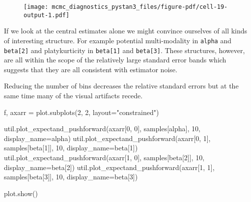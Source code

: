 \documentclass[
  letterpaper,
  DIV=11,
  numbers=noendperiod]{scrartcl}
\newenvironment{Shaded}{\begin{snugshade}}{\end{snugshade}}
\newcommand{\DecValTok}[1]{\textcolor[rgb]{0.68,0.00,0.00}{#1}}
\newcommand{\NormalTok}[1]{\textcolor[rgb]{0.00,0.23,0.31}{#1}}
\newcommand{\OperatorTok}[1]{\textcolor[rgb]{0.37,0.37,0.37}{#1}}
\newcommand{\StringTok}[1]{\textcolor[rgb]{0.13,0.47,0.30}{#1}}
\begin{document}
\begin{figure}[H]

{\centering \texttt{[image: mcmc\_diagnostics\_pystan3\_files/figure-pdf/cell-19-output-1.pdf]}

}

\end{figure}

If we look at the central estimates alone we might convince ourselves of
all kinds of interesting structure. For example potential multi-modality
in \texttt{alpha} and \texttt{beta{[}2{]}} and platykurticity in
\texttt{beta{[}1{]}} and \texttt{beta{[}3{]}}. These structures,
however, are all within the scope of the relatively large standard error
bands which suggests that they are all consistent with estimator noise.

Reducing the number of bins decreases the relative standard errors but
at the same time many of the visual artifacts recede.

\begin{Shaded}
\begin{Highlighting}[]
\NormalTok{f, axarr }\OperatorTok{=}\NormalTok{ plot.subplots(}\DecValTok{2}\NormalTok{, }\DecValTok{2}\NormalTok{, layout}\OperatorTok{=}\StringTok{"constrained"}\NormalTok{)}

\NormalTok{util.plot\_expectand\_pushforward(axarr[}\DecValTok{0}\NormalTok{, }\DecValTok{0}\NormalTok{], samples[}\StringTok{\textquotesingle{}alpha\textquotesingle{}}\NormalTok{], }
                                \DecValTok{10}\NormalTok{, display\_name}\OperatorTok{=}\StringTok{\textquotesingle{}alpha\textquotesingle{}}\NormalTok{)}
\NormalTok{util.plot\_expectand\_pushforward(axarr[}\DecValTok{0}\NormalTok{, }\DecValTok{1}\NormalTok{], samples[}\StringTok{\textquotesingle{}beta[1]\textquotesingle{}}\NormalTok{], }
                                \DecValTok{10}\NormalTok{, display\_name}\OperatorTok{=}\StringTok{\textquotesingle{}beta[1]\textquotesingle{}}\NormalTok{)}
\NormalTok{util.plot\_expectand\_pushforward(axarr[}\DecValTok{1}\NormalTok{, }\DecValTok{0}\NormalTok{], samples[}\StringTok{\textquotesingle{}beta[2]\textquotesingle{}}\NormalTok{], }
                                \DecValTok{10}\NormalTok{, display\_name}\OperatorTok{=}\StringTok{\textquotesingle{}beta[2]\textquotesingle{}}\NormalTok{)}
\NormalTok{util.plot\_expectand\_pushforward(axarr[}\DecValTok{1}\NormalTok{, }\DecValTok{1}\NormalTok{], samples[}\StringTok{\textquotesingle{}beta[3]\textquotesingle{}}\NormalTok{], }
                                \DecValTok{10}\NormalTok{, display\_name}\OperatorTok{=}\StringTok{\textquotesingle{}beta[3]\textquotesingle{}}\NormalTok{)}

\NormalTok{plot.show()}
\end{Highlighting}
\end{Shaded}
\end{document}
